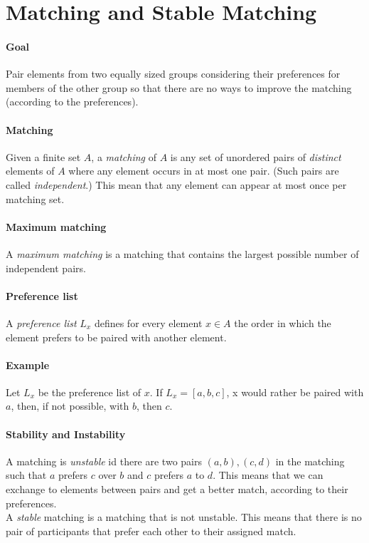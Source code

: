 \documentclass[10pt,a4paper]{book}
\begin{document}
\section{Matching and Stable Matching}
\paragraph*{Goal}
Pair elements from two equally sized groups considering their preferences for members of the other group so that there are no ways to improve the matching (according to the preferences).
\paragraph*{Matching}
Given a finite set $A$, a \textit{matching} of $A$ is any set of unordered pairs of \textit{distinct} elements of $A$ where any element occurs in at most one pair. (Such pairs are called \textit{independent}.) This mean that any element can appear at most once per matching set.
\paragraph*{Maximum matching}
A \textit{maximum matching} is a matching that contains the largest possible number of independent pairs.
\paragraph*{Preference list}
A \textit{preference list} $L_x$ defines for every element $x \in A$ the order in which the element prefers to be paired with another element. 
\paragraph*{Example}
Let $L_x$ be the preference list of $x$. If $L_x = [a,b,c]$, x would rather be paired with $a$, then, if not possible, with $b$, then $c$.
\paragraph*{Stability and Instability}
A matching is \textit{unstable} id there are two pairs $(a,b),(c,d)$ in the matching such that $a$ prefers $c$ over $b$ and $c$ prefers $a$ to $d$. This means that we can exchange to elements between pairs and get a better match, according to their preferences.\\
A \textit{stable} matching is a matching that is not unstable. This means that there is no pair of participants that prefer each other to their assigned match. 
\end{document}
